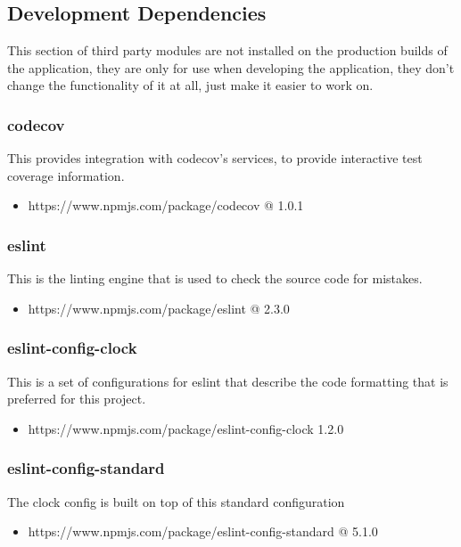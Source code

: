 \subsection{Development Dependencies}
  This section of third party modules are not installed on the production builds of the application, they are only for use when developing the application, they don't change the functionality of it at all, just make it easier to work on. 

  \subsubsection{codecov}
  This provides integration with codecov's services, to provide interactive test coverage information.
  \begin{itemize}
    \item https://www.npmjs.com/package/codecov @ 1.0.1
  \end{itemize}

  \subsubsection{eslint}
  This is the linting engine that is used to check the source code for mistakes.
  \begin{itemize}
    \item https://www.npmjs.com/package/eslint @ 2.3.0
  \end{itemize}

  \subsubsection{eslint-config-clock}
  This is a set of configurations for eslint that describe the code formatting that is preferred for this project.
  \begin{itemize}
    \item https://www.npmjs.com/package/eslint-config-clock 1.2.0
  \end{itemize}

  \subsubsection{eslint-config-standard}
  The clock config is built on top of this standard configuration
  \begin{itemize}
    \item https://www.npmjs.com/package/eslint-config-standard @ 5.1.0
  \end{itemize}

